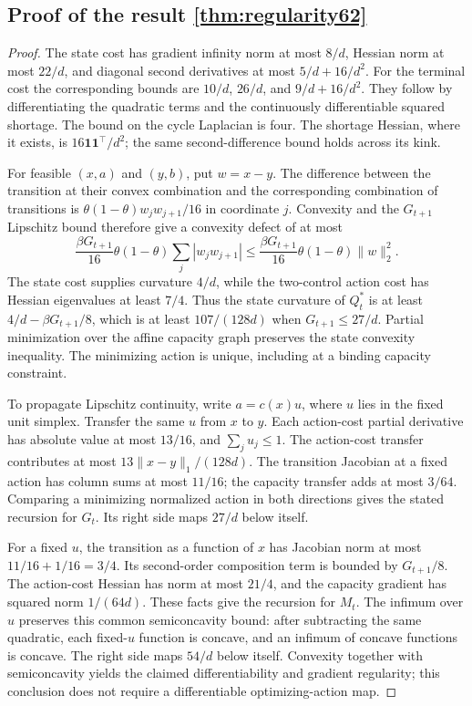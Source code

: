 \subsection{Proof of the result \ref{thm:regularity62}}\label{supp:proof-accuracy62-print-1}
\begin{proof}
The state cost has gradient infinity norm at most $8/d$, Hessian norm at most $22/d$, and diagonal second derivatives at most $5/d+16/d^2$. For the terminal cost the corresponding bounds are $10/d$, $26/d$, and $9/d+16/d^2$. They follow by differentiating the quadratic terms and the continuously differentiable squared shortage. The bound on the cycle Laplacian is four. The shortage Hessian, where it exists, is $16\mathbf1\mathbf1^\top/d^2$; the same second-difference bound holds across its kink.

For feasible $(x,a)$ and $(y,b)$, put $w=x-y$. The difference between the transition at their convex combination and the corresponding combination of transitions is $\theta(1-\theta)w_jw_{j+1}/16$ in coordinate $j$. Convexity and the $G_{t+1}$ Lipschitz bound therefore give a convexity defect of at most
\[
 \frac{\beta G_{t+1}}{16}\theta(1-\theta)
                 \sum_j|w_jw_{j+1}|
 \le\frac{\beta G_{t+1}}{16}\theta(1-\theta)\|w\|_2^2.
\]
The state cost supplies curvature $4/d$, while the two-control action cost has Hessian eigenvalues at least $7/4$. Thus the state curvature of $Q_t^*$ is at least $4/d-\beta G_{t+1}/8$, which is at least $107/(128d)$ when $G_{t+1}\le27/d$. Partial minimization over the affine capacity graph preserves the state convexity inequality. The minimizing action is unique, including at a binding capacity constraint.

To propagate Lipschitz continuity, write $a=c(x)u$, where $u$ lies in the fixed unit simplex. Transfer the same $u$ from $x$ to $y$. Each action-cost partial derivative has absolute value at most $13/16$, and $\sum_j u_j\le1$. The action-cost transfer contributes at most $13\|x-y\|_1/(128d)$. The transition Jacobian at a fixed action has column sums at most $11/16$; the capacity transfer adds at most $3/64$. Comparing a minimizing normalized action in both directions gives the stated recursion for $G_t$. Its right side maps $27/d$ below itself.

For a fixed $u$, the transition as a function of $x$ has Jacobian norm at most $11/16+1/16=3/4$. Its second-order composition term is bounded by $G_{t+1}/8$. The action-cost Hessian has norm at most $21/4$, and the capacity gradient has squared norm $1/(64d)$. These facts give the recursion for $M_t$. The infimum over $u$ preserves this common semiconcavity bound: after subtracting the same quadratic, each fixed-$u$ function is concave, and an infimum of concave functions is concave. The right side maps $54/d$ below itself. Convexity together with semiconcavity yields the claimed differentiability and gradient regularity; this conclusion does not require a differentiable optimizing-action map.


\end{proof}
